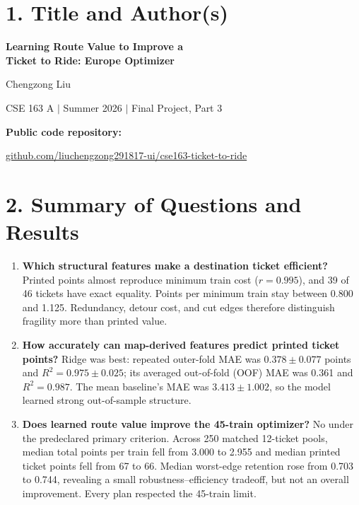 \documentclass[11pt]{article}
\begin{document}
\thispagestyle{fancy}
\section*{1. Title and Author(s)}

\begin{center}
{\LARGE\bfseries Learning Route Value to Improve a\\[3pt]
Ticket to Ride: Europe Optimizer}\par
\vspace{0.28in}
{\large Chengzong Liu}\par
CSE 163 A $\mid$ Summer 2026 $\mid$ Final Project, Part 3\par
\vspace{0.15in}
\textbf{Public code repository:}\par
\href{https://github.com/liuchengzong291817-ui/cse163-ticket-to-ride}
{github.com/liuchengzong291817-ui/cse163-ticket-to-ride}
\end{center}

\section*{2. Summary of Questions and Results}

\begin{enumerate}[label=\textbf{RQ\arabic*.}]
  \item \textbf{Which structural features make a destination ticket
  efficient?} Printed points almost reproduce minimum train cost
  ($r=0.995$), and 39 of 46 tickets have exact equality. Points per minimum
  train stay between 0.800 and 1.125. Redundancy, detour cost, and cut edges
  therefore distinguish fragility more than printed value.

  \item \textbf{How accurately can map-derived features predict printed
  ticket points?} Ridge was best: repeated outer-fold MAE was
  $0.378\pm0.077$ points and $R^2=0.975\pm0.025$; its averaged out-of-fold
  (OOF) MAE was 0.361 and $R^2=0.987$. The mean baseline's MAE was
  $3.413\pm1.002$, so the model learned strong out-of-sample structure.

  \item \textbf{Does learned route value improve the 45-train optimizer?}
  No under the predeclared primary criterion. Across 250 matched 12-ticket
  pools, median total points per train fell from 3.000 to 2.955 and median
  printed ticket points fell from 67 to 66. Median worst-edge retention rose
  from 0.703 to 0.744, revealing a small robustness--efficiency tradeoff, but
  not an overall improvement. Every plan respected the 45-train limit.
\end{enumerate}
\end{document}
